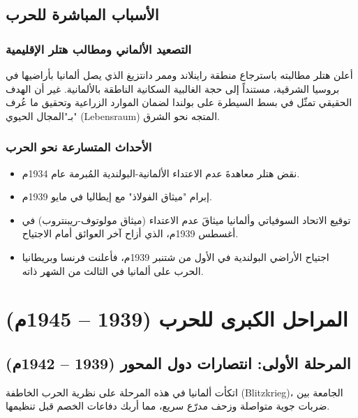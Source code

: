\documentclass[12pt, a4paper]{article}
\begin{document}
\subsection{الأسباب المباشرة للحرب}

\subsubsection{التصعيد الألماني ومطالب هتلر الإقليمية}
أعلن هتلر مطالبته باسترجاع منطقة راينلاند وممر دانتزيغ الذي يصل ألمانيا بأراضيها
في بروسيا الشرقية، مستنداً إلى حجة الغالبية السكانية الناطقة بالألمانية.
غير أن الهدف الحقيقي تمثّل في بسط السيطرة على بولندا لضمان الموارد الزراعية
وتحقيق ما عُرف بـ"المجال الحيوي" (Lebensraum) المتجه نحو الشرق.

\subsubsection{الأحداث المتسارعة نحو الحرب}
\begin{itemize}[leftmargin=*, itemsep=3pt]
  \item نقض هتلر معاهدةَ عدم الاعتداء الألمانية-البولندية المُبرمة عام 1934م.
  \item إبرام "ميثاق الفولاذ" مع إيطاليا في مايو 1939م.
  \item توقيع الاتحاد السوفياتي وألمانيا ميثاقَ عدم الاعتداء (ميثاق مولوتوف-ريبنتروب)
        في أغسطس 1939م، الذي أزاح آخر العوائق أمام الاجتياح.
  \item اجتياح الأراضي البولندية في الأول من شتنبر 1939م، فأعلنت فرنسا وبريطانيا
        الحرب على ألمانيا في الثالث من الشهر ذاته.
\end{itemize}

\section{المراحل الكبرى للحرب (1939 – 1945م)}

\subsection{المرحلة الأولى: انتصارات دول المحور (1939 – 1942م)}

اتكأت ألمانيا في هذه المرحلة على نظرية الحرب الخاطفة (Blitzkrieg)، الجامعة بين
ضربات جوية متواصلة وزحف مدرّع سريع، مما أربك دفاعات الخصم قبل تنظيمها.
\end{document}

